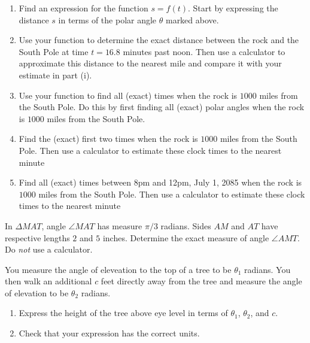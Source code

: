 \documentclass{ximera}
\begin{document}
\begin{question}
\begin{enumerate}
\item Find an expression for the function $s=f(t)$. Start by expressing the distance $s$ in terms of the polar angle $\theta$ marked above.

\item Use your function to determine the exact distance between the rock and the South Pole at time $t=16.8$ minutes past noon. Then use a calculator to approximate this distance to the nearest mile and compare it with your estimate in part (i).

\item Use  your function to find all (exact) times when the rock is $1000$ miles from the South Pole. Do this by first finding all (exact) polar angles when the rock is $1000$ miles from the South Pole.

\item Find the (exact) first two times when the rock is $1000$ miles from the South Pole. Then use a calculator to estimate these clock times to the nearest minute

\item Find all (exact) times between 8pm and 12pm, July 1, 2085 when the rock is $1000$ miles from the South Pole. Then use a calculator to estimate these clock times to the nearest minute

\end{enumerate}
\end{question}


\begin{question} \label{Q898dfbfdgdsg}
In $\Delta MAT$, angle $\angle MAT$ has measure $\pi/3$ radians. Sides $AM$ and $AT$ have respective lengths $2$ and $5$ inches. Determine the exact measure of angle $\angle AMT$. Do \emph{not} use a calculator.
\end{question}

\begin{question} \label{QPPLFKEbd}
You measure the angle of eleveation to the top of a tree to be $\theta_1$ radians. You then walk an additional $c$ feet directly away from the tree and measure the angle of elevation to be $\theta_2$ radians. 
\begin{enumerate}
\item Express the height of the tree above eye level in terms of $\theta_1$, $\theta_2$, and $c$.

\item Check that your expression has the correct units.
\end{enumerate} 
\end{question}
\end{document}
